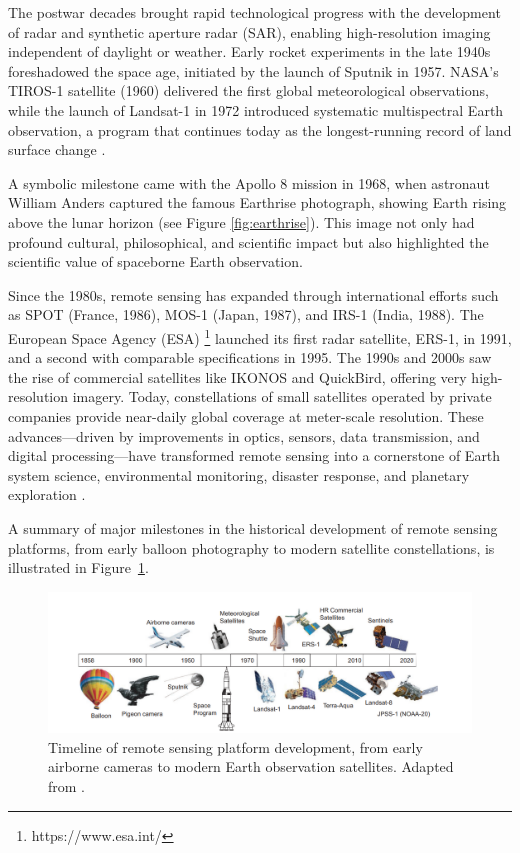 The postwar decades brought rapid technological progress with the development of radar and synthetic aperture radar (SAR), enabling high-resolution imaging independent of daylight or weather. Early rocket experiments in the late 1940s foreshadowed the space age, initiated by the launch of Sputnik in 1957. NASA's TIROS-1 satellite (1960) delivered the first global meteorological observations, while the launch of Landsat-1 in 1972 introduced systematic multispectral Earth observation, a program that continues today as the longest-running record of land surface change \cite{book_Physics_Techniques_RS,book_Satellite_RS}.

A symbolic milestone came with the Apollo 8 mission in 1968, when astronaut William Anders captured the famous Earthrise photograph, showing Earth rising above the lunar horizon (see Figure \ref{fig:earthrise}). This image not only had profound cultural, philosophical, and scientific impact but also highlighted the scientific value of spaceborne Earth observation.

Since the 1980s, remote sensing has expanded through international efforts such as SPOT (France, 1986), MOS-1 (Japan, 1987), and IRS-1 (India, 1988). The European Space Agency (ESA) \footnote{https://www.esa.int/} launched its first radar satellite, ERS-1, in 1991, and a second with comparable specifications in 1995. The 1990s and 2000s saw the rise of commercial satellites like IKONOS and QuickBird, offering very high-resolution imagery. Today, constellations of small satellites operated by private companies provide near-daily global coverage at meter-scale resolution. These advances—driven by improvements in optics, sensors, data transmission, and digital processing—have transformed remote sensing into a cornerstone of Earth system science, environmental monitoring, disaster response, and planetary exploration \cite{book_Satellite_RS}.

A summary of major milestones in the historical development of remote sensing platforms, from early balloon photography to modern satellite constellations, is illustrated in Figure~\ref{fig:RS_timeline}.

\begin{figure}[H]
  \centering
  \includegraphics[width=\textwidth]{img/RS_timeline.png}
  \caption{Timeline of remote sensing platform development, from early airborne cameras to modern Earth observation satellites. Adapted from \cite{book_Satellite_RS}.}
  \label{fig:RS_timeline}
\end{figure}


